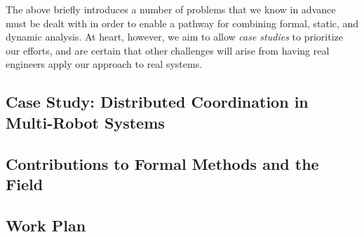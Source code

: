 The above briefly introduces a number of problems that we know in advance must
be dealt with in order to enable a pathway for combining formal,
static, and dynamic analysis.    At heart, however, we aim to allow
\emph{case studies} to prioritize our efforts, and
are certain that other challenges will arise from having real
engineers apply our approach to real systems.



\subsection{Case Study: Distributed Coordination in Multi-Robot Systems}
\label{sec:case-study-robots}


\subsection{Contributions to Formal Methods and the Field}
\label{sec:contributions}


\subsection{Work Plan}

